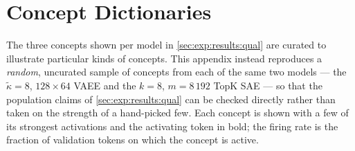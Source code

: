 \chapter{Concept Dictionaries} \label{ch:app:concept-dict}

The three concepts shown per model in \cref{sec:exp:results:qual}
are curated to illustrate particular kinds of concepts. This appendix instead
reproduces a \textit{random}, uncurated sample of concepts from each of the same
two models --- the $\tilde{\kappa} = 8$, $128 \times 64$ \ac{VAEE} and the $k =
8$, $m = 8\,192$ TopK \ac{SAE} --- so that the population claims of
\cref{sec:exp:results:qual} can be
checked directly rather than taken on the strength of a hand-picked few. Each
concept is shown with a few of its strongest activations and the activating
token in bold; the firing rate is the fraction of validation tokens on which the
concept is active.


%

